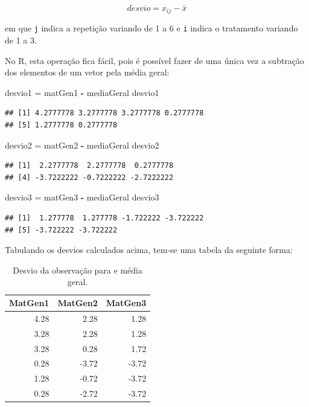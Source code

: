 \documentclass[
]{article}
\newenvironment{Shaded}{\begin{snugshade}}{\end{snugshade}}
\newcommand{\NormalTok}[1]{#1}
\newcommand{\OperatorTok}[1]{\textcolor[rgb]{0.81,0.36,0.00}{\textbf{#1}}}
\newcommand{\StringTok}[1]{\textcolor[rgb]{0.31,0.60,0.02}{#1}}
\begin{document}
\[desvio = x_{ij} - \bar{x}\]

em que \texttt{j} indica a repetição variando de 1 a 6 e \texttt{i} indica o tratamento variando de 1 a 3.

No R, esta operação fica fácil, pois é possível fazer de uma única vez a subtração dos elementos de um vetor pela média geral:

\begin{Shaded}
\begin{Highlighting}[]
\NormalTok{desvio1 =}\StringTok{ }\NormalTok{matGen1 }\OperatorTok{-}\StringTok{ }\NormalTok{mediaGeral}
\NormalTok{desvio1}
\end{Highlighting}
\end{Shaded}

\begin{verbatim}
## [1] 4.2777778 3.2777778 3.2777778 0.2777778
## [5] 1.2777778 0.2777778
\end{verbatim}

\begin{Shaded}
\begin{Highlighting}[]
\NormalTok{desvio2 =}\StringTok{ }\NormalTok{matGen2 }\OperatorTok{-}\StringTok{ }\NormalTok{mediaGeral}
\NormalTok{desvio2}
\end{Highlighting}
\end{Shaded}

\begin{verbatim}
## [1]  2.2777778  2.2777778  0.2777778
## [4] -3.7222222 -0.7222222 -2.7222222
\end{verbatim}

\begin{Shaded}
\begin{Highlighting}[]
\NormalTok{desvio3 =}\StringTok{ }\NormalTok{matGen3 }\OperatorTok{-}\StringTok{ }\NormalTok{mediaGeral}
\NormalTok{desvio3}
\end{Highlighting}
\end{Shaded}

\begin{verbatim}
## [1]  1.277778  1.277778 -1.722222 -3.722222
## [5] -3.722222 -3.722222
\end{verbatim}

Tabulando os desvios calculados acima, tem-se uma tabela da seguinte forma:

\begin{table}

\caption{\label{tab:unnamed-chunk-16}Desvio da observação para e média geral.}
\centering
\begin{tabular}[t]{r|r|r}
\hline
MatGen1 & MatGen2 & MatGen3\\
\hline
4.28 & 2.28 & 1.28\\
\hline
3.28 & 2.28 & 1.28\\
\hline
3.28 & 0.28 & 1.72\\
\hline
0.28 & -3.72 & -3.72\\
\hline
1.28 & -0.72 & -3.72\\
\hline
0.28 & -2.72 & -3.72\\
\hline
\end{tabular}
\end{table}
\end{document}

